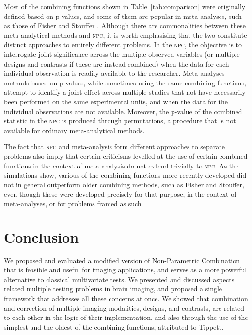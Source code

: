 Most of the combining functions shown in Table~\ref{tab:comparison} were originally defined based on p-values, and some of them are popular in meta-analyses, such as those of Fisher and Stouffer \citep{Borenstein2009}. Although there are commonalities between these meta-analytical methods and \textsc{npc}, it is worth emphasising that the two constitute distinct approaches to entirely different problems. In the \textsc{npc}, the objective is to interrogate joint significance across the multiple observed variables (or multiple designs and contrasts if these are instead combined) when the data for each individual observation is readily available to the researcher. Meta-analyses methods based on p-values, while sometimes using the same combining functions, attempt to identify a joint effect across multiple studies that not have necessarily been performed on the same experimental units, and when the data for the individual observations are not available. Moreover, the p-value of the combined statistic in the \textsc{npc} is produced through permutations, a procedure that is not available for ordinary meta-analytical methods. 

The fact that \textsc{npc} and meta-analysis form different approaches to separate problems also imply that certain criticisms levelled at the use of certain combined functions in the context of meta-analysis do not extend trivially to \textsc{npc}. As the simulations show, various of the combining functions more recently developed did not in general outperform older combining methods, such as Fisher and Stouffer, even though these were developed precisely for that purpose, in the context of meta-analyses, or for problems framed as such.

\section{Conclusion}

We proposed and evaluated a modified version of Non-Parametric Combination that is feasible and useful for imaging applications, and serves as a more powerful alternative to classical multivariate tests. We presented and discussed aspects related multiple testing problems in brain imaging, and proposed a single framework that addresses all these concerns at once. We showed that combination and correction of multiple imaging modalities, designs, and contrasts, are related to each other in the logic of their implementation, and also through the use of the simplest and the oldest of the combining functions, attributed to Tippett.
